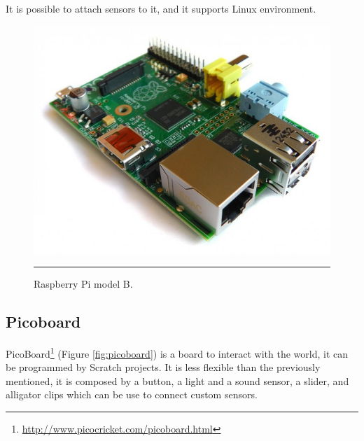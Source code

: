 \documentclass[12pt, a4paper,twoside]{tesi_upf}
\begin{document}
      It is possible to attach sensors to it, and it supports Linux environment.
      \begin{figure}[htbp]
          \centering
              \includegraphics[scale=0.2]{./Figures/raspberry-pi-model-b.jpg}
              \\
              \rule{15em}{0.5pt}
          \caption[Raspberry Pi model B]{Raspberry Pi model B.}
          \label{fig:RaspberryPiB}
       \end{figure}
    
    \subsection{Picoboard}      
      PicoBoard\footnote{\url{http://www.picocricket.com/picoboard.html}} (Figure \ref{fig:picoboard}) is a board to interact with the world, it can be programmed by Scratch projects. It is less flexible than the previously mentioned, it is composed by a button, a light and a sound sensor, a slider, and alligator clips which can be use to connect custom sensors.
      
\end{document}
